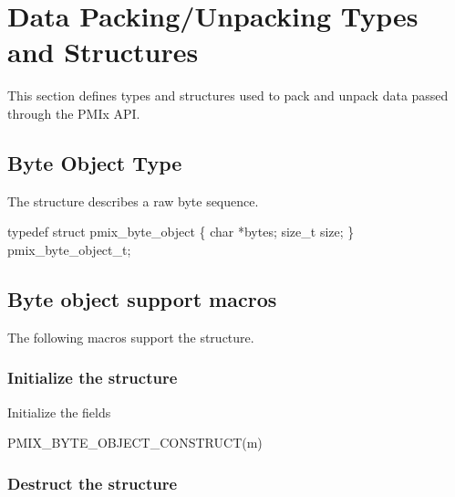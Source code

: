 \section{Data Packing/Unpacking Types and Structures}

This section defines types and structures used to pack and unpack data passed through the PMIx API.

\subsection{Byte Object Type}

The  structure describes a raw byte sequence.

\cspecificstart
\begin{codepar}
typedef struct pmix_byte_object \{
    char *bytes;
    size_t size;
\} pmix_byte_object_t;
\end{codepar}
\cspecificend

\subsection{Byte object support macros}
The following macros support the  structure.

\subsubsection{Initialize the  structure}

Initialize the  fields

\cspecificstart
\begin{codepar}
PMIX_BYTE_OBJECT_CONSTRUCT(m)
\end{codepar}
\cspecificend

\begin{arglist}
\end{arglist}

\subsubsection{Destruct the  structure}

